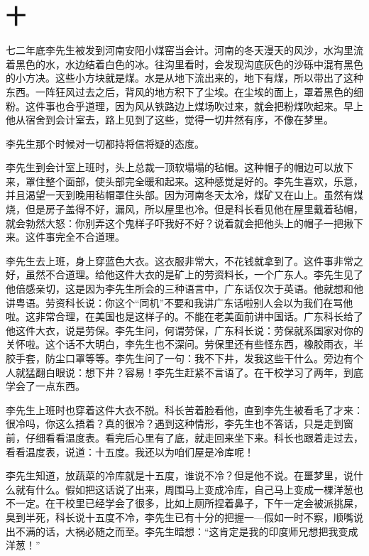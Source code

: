 \section{十}

七二年底李先生被发到河南安阳小煤窑当会计。河南的冬天漫天的风沙，水沟里流着黑色的水，水边结着白色的冰。往沟里看时，会发现沟底灰色的沙砾中混有黑色的小方决。这些小方块就是煤。水是从地下流出来的，地下有煤，所以带出了这种东西。一阵狂风过去之后，背风的地方积下了尘埃。在尘埃的面上，罩着黑色的细粉。这件事也合乎道理，因为风从铁路边上煤场吹过来，就会把粉煤吹起来。早上他从宿舍到会计室去，路上见到了这些，觉得一切井然有序，不像在梦里。 

李先生那个时候对一切都持将信将疑的态度。 

李先生到会计室上班时，头上总裁一顶软塌塌的毡帽。这种帽子的帽边可以放下来，罩住整个面部，使头部完全暖和起来。这种感觉是好的。李先生喜欢，乐意，并且渴望一天到晚用毡帽罩住头部。因为河南冬天太冷，煤矿又在山上。虽然有煤烧，但是房子盖得不好，漏风，所以屋里也冷。但是科长看见他在屋里戴着毡帽，就会勃然大怒：你别弄这个鬼样子吓我好不好？说着就会把他头上的帽子一把揪下来。这件事完全不合道理。 

李先生去上班，身上穿蓝色大衣。这衣服非常大，不花钱就拿到了。这件事非常之好，虽然不合道理。给他这件大衣的是矿上的劳资料长，一个广东人。李先生见了他倍感亲切，这是因为李先生所会的三种语言中，广东话仅次于英语。他就想和他讲粤语。劳资科长说：你这个“同机”不要和我讲广东话啦别人会以为我们在骂他啦。这非常合理，在美国也是这样子的。不能在老美面前讲中国话。广东科长给了他这件大衣，说是劳保。李先生问，何谓劳保，广东科长说：劳保就系国家对你的关怀啦。这个话不大明白，李先生也不深问。劳保里还有些怪东西，橡胶雨衣，半胶手套，防尘口罩等等。李先生问了一句：我不下井，发我这些干什么。旁边有个人就猛翻白眼说：想下井？容易！李先生赶紧不言语了。在干校学习了两年，到底学会了一点东西。 


李先生上班时也穿着这件大衣不脱。科长苦着脸看他，直到李先生被看毛了才来：很冷吗，你这么捂着？真的很冷？遇到这种情形，李先生也不答话，只是走到窗前，仔细看看温度表。看完后心里有了底，就走回来坐下来。科长也跟着走过去，看看温度表，说道：十五度。我还以为咱们屋是冷库呢！ 

李先生知道，放蔬菜的冷库就是十五度，谁说不冷？但是他不说。在噩梦里，说什么就有什么。假如把这话说了出来，周围马上变成冷库，自己马上变成一棵洋葱也不一定。在干校里已经学会了很多，比如上厕所捏着鼻子，下午一定会被派挑屎，臭到半死，科长说十五度不冷，李先生已有十分的把握一—假如一时不察，顺嘴说出不满的话，大祸必随之而至。李先生暗想：“这肯定是我的印度师兄想把我变成洋葱！” 

